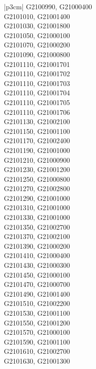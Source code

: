 \begin{customLongTable}{ |p{3cm}| }
G2100990, G21000400 \\ \hline
G2101010, G21001400 \\ \hline
G2101030, G21001800 \\ \hline
G2101050, G21000100 \\ \hline
G2101070, G21000200 \\ \hline
G2101090, G21000800 \\ \hline
G2101110, G21001701 \\ \hline
G2101110, G21001702 \\ \hline
G2101110, G21001703 \\ \hline
G2101110, G21001704 \\ \hline
G2101110, G21001705 \\ \hline
G2101110, G21001706 \\ \hline
G2101130, G21002100 \\ \hline
G2101150, G21001100 \\ \hline
G2101170, G21002400 \\ \hline
G2101190, G21001000 \\ \hline
G2101210, G21000900 \\ \hline
G2101230, G21001200 \\ \hline
G2101250, G21000800 \\ \hline
G2101270, G21002800 \\ \hline
G2101290, G21001000 \\ \hline
G2101310, G21001000 \\ \hline
G2101330, G21001000 \\ \hline
G2101350, G21002700 \\ \hline
G2101370, G21002100 \\ \hline
G2101390, G21000200 \\ \hline
G2101410, G21000400 \\ \hline
G2101430, G21000300 \\ \hline
G2101450, G21000100 \\ \hline
G2101470, G21000700 \\ \hline
G2101490, G21001400 \\ \hline
G2101510, G21002200 \\ \hline
G2101530, G21001100 \\ \hline
G2101550, G21001200 \\ \hline
G2101570, G21000100 \\ \hline
G2101590, G21001100 \\ \hline
G2101610, G21002700 \\ \hline
G2101630, G21001300 \\ \hline

\end{customLongTable}
